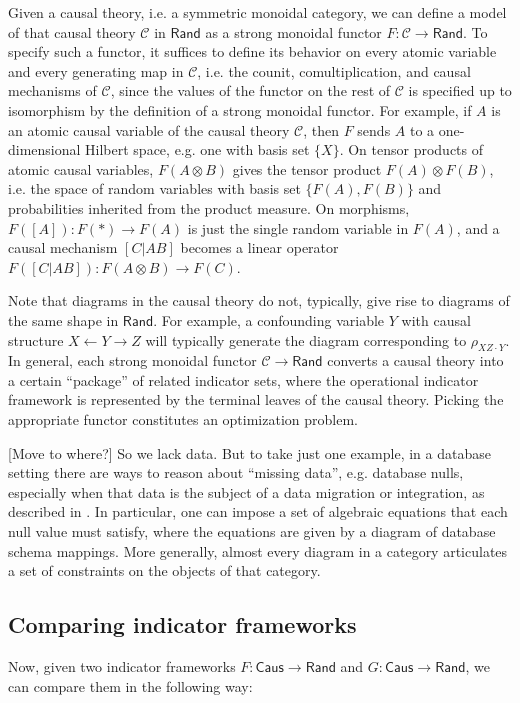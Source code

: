 \documentclass{article}
\theoremstyle{definition}
\newcommand{\Cat}[1]{\mathsf{#1}}
\def\Rand{\Cat{Rand}}
\def\Caus{\Cat{Caus}}
\begin{document}
Given a causal theory, i.e. a symmetric monoidal category, we can define a model of that causal theory $\mathcal{C}$ in $\Rand$ as a strong monoidal functor $F : \mathcal{C} \to \Rand$. To specify such a functor, it suffices to define its behavior on every atomic variable and every generating map in $\mathcal{C}$, i.e. the counit, comultiplication, and causal mechanisms of $\mathcal{C}$, since the values of the functor on the rest of $\mathcal{C}$ is specified up to isomorphism by the definition of a strong monoidal functor. For example, if $A$ is an atomic causal variable of the causal theory $\mathcal{C}$, then $F$ sends $A$ to a one-dimensional Hilbert space, e.g. one with basis set $\{X\}$. On tensor products of atomic causal variables, $F(A \otimes B)$ gives the tensor product $F(A) \otimes F(B)$, i.e. the space of random variables with basis set $\{F(A), F(B)\}$ and probabilities inherited from the product measure. On morphisms, $F([A]) : F(\ast) \to F(A)$ is just the single random variable in $F(A)$, and a causal mechanism $[C|AB]$ becomes a linear operator $F([C|AB]) : F(A \otimes B) \to F(C)$. %

Note that diagrams in the causal theory do not, typically, give rise to diagrams of the same shape in $\Rand$. For example, a confounding variable $Y$ with causal structure $X \leftarrow Y \to Z$ will typically generate the diagram corresponding to $\rho_{XZ\cdot Y}$. In general, each strong monoidal functor $\mathcal{C} \to \Rand$ converts a causal theory into a certain ``package'' of related indicator sets, where the operational indicator framework is represented by the terminal leaves of the causal theory. Picking the appropriate functor constitutes an optimization problem.

[Move to where?] So we lack data. But to take just one example, in a database setting there are ways to reason about ``missing data'', e.g. database nulls, especially when that data is the subject of a data migration or integration, as described in \cite{spivak10}. In particular, one can impose a set of algebraic equations that each null value must satisfy, where the equations are given by a diagram of database schema mappings. More generally, almost every diagram in a category articulates a set of constraints on the objects of that category.

\subsection{Comparing indicator frameworks}
Now, given two indicator frameworks $F: \Caus \to \Rand$ and $G : \Caus \to \Rand$, we can compare them in the following way:
\end{document}
